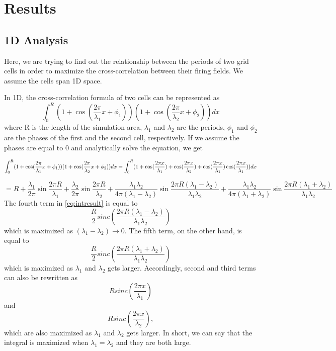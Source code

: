 \documentclass[11pt, letterpaper, onecolumn]{article}
\begin{document}
\section{Results}

\subsection{1D Analysis}
Here, we are trying to find out the relationship between the periods of two grid cells in order to maximize the cross-correlation between their firing fields. We assume the cells span 1D space.

In 1D, the cross-correlation formula of two cells can be represented as
\begin{equation}
\int_{0}^{R} (1 + \cos(\frac{2 \pi}{\lambda_1} x + \phi_1)) (1 + \cos(\frac{2 \pi}{\lambda_2} x + \phi_2)) dx
\end{equation}
where R is the length of the simulation area, $ \lambda_1 $ and $ \lambda_2 $ are the periods, $ \phi_1 $ and $ \phi_2 $ are the phases of the first and the second cell, respectively. If we assume the phases are equal to 0 and analytically solve the equation, we get

\begin{equation}
\int_{0}^{R} (1 + \cos(\frac{2 \pi}{\lambda_1} x + \phi_1)) (1 + \cos(\frac{2 \pi}{\lambda_2} x + \phi_2)) dx = \int_{0}^{R} (1 + \cos(\frac{2 \pi x}{\lambda_1}) + \cos(\frac{2 \pi x}{\lambda_2}) + \cos(\frac{2 \pi x}{\lambda_1}) \cos(\frac{2 \pi x}{\lambda_1} )) dx \notag
\end{equation}

\begin{equation}
= R + \frac{\lambda_1}{2 \pi} \sin \frac{2 \pi R}{\lambda_1} + \frac{\lambda_2}{2 \pi} \sin \frac{2 \pi R}{\lambda_2} + \frac{\lambda_1 \lambda_2}{4 \pi (\lambda_1 - \lambda_2)} \sin \frac{2 \pi R (\lambda_1 - \lambda_2)}{\lambda_1 \lambda_2} + \frac{\lambda_1 \lambda_2}{4 \pi (\lambda_1 + \lambda_2)} \sin \frac{2 \pi R (\lambda_1 + \lambda_2)}{\lambda_1 \lambda_2}
\label{eq:intresult}
\end{equation}
The fourth term in \eqref{eq:intresult} is equal to $$ \frac{R}{2} sinc(\frac{2 \pi R (\lambda_1 - \lambda_2)}{\lambda_1 \lambda_2}) $$ which is maximized as $ (\lambda_1 - \lambda_2)\rightarrow 0 $. The fifth term, on the other hand, is equal to $$ \frac{R}{2} sinc(\frac{2 \pi R (\lambda_1 + \lambda_2)}{\lambda_1 \lambda_2}) $$ which is maximized as $ \lambda_1 $ and $ \lambda_2 $ gets larger. Accordingly, second and third terms can also be rewritten as $$ R sinc(\frac{2 \pi x }{\lambda_1}) $$ and $$ R sinc(\frac{2 \pi x }{\lambda_2}), $$ which are also maximized as $ \lambda_1 $ and $ \lambda_2 $ gets larger. In short, we can say that the integral is maximized when $ \lambda_1 = \lambda_2 $ and they are both large.
\end{document}
